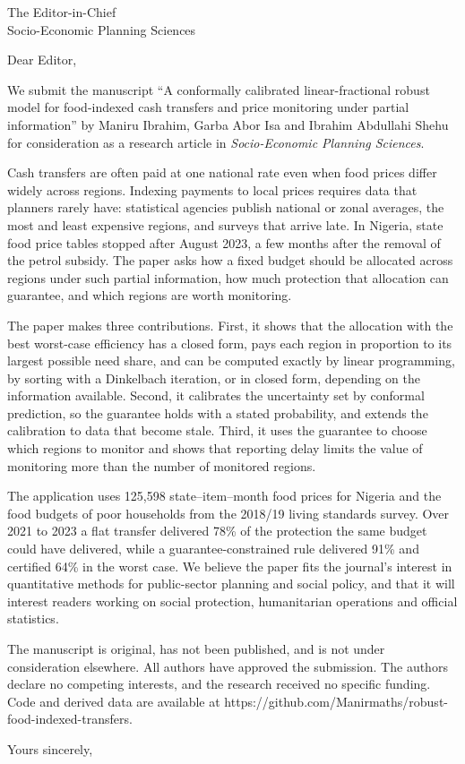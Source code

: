 \documentclass[11pt,a4paper]{letter}
\date{\today}
\begin{document}
\begin{letter}{The Editor-in-Chief\\Socio-Economic Planning Sciences}
\opening{Dear Editor,}

We submit the manuscript ``A conformally calibrated linear-fractional robust model for food-indexed cash transfers and price monitoring under partial information'' by Maniru Ibrahim, Garba Abor Isa and Ibrahim Abdullahi Shehu for consideration as a research article in \emph{Socio-Economic Planning Sciences}.

Cash transfers are often paid at one national rate even when food prices differ widely across regions. Indexing payments to local prices requires data that planners rarely have: statistical agencies publish national or zonal averages, the most and least expensive regions, and surveys that arrive late. In Nigeria, state food price tables stopped after August 2023, a few months after the removal of the petrol subsidy. The paper asks how a fixed budget should be allocated across regions under such partial information, how much protection that allocation can guarantee, and which regions are worth monitoring.

The paper makes three contributions. First, it shows that the allocation with the best worst-case efficiency has a closed form, pays each region in proportion to its largest possible need share, and can be computed exactly by linear programming, by sorting with a Dinkelbach iteration, or in closed form, depending on the information available. Second, it calibrates the uncertainty set by conformal prediction, so the guarantee holds with a stated probability, and extends the calibration to data that become stale. Third, it uses the guarantee to choose which regions to monitor and shows that reporting delay limits the value of monitoring more than the number of monitored regions.

The application uses 125,598 state--item--month food prices for Nigeria and the food budgets of poor households from the 2018/19 living standards survey. Over 2021 to 2023 a flat transfer delivered 78\% of the protection the same budget could have delivered, while a guarantee-constrained rule delivered 91\% and certified 64\% in the worst case. We believe the paper fits the journal's interest in quantitative methods for public-sector planning and social policy, and that it will interest readers working on social protection, humanitarian operations and official statistics.

The manuscript is original, has not been published, and is not under consideration elsewhere. All authors have approved the submission. The authors declare no competing interests, and the research received no specific funding. Code and derived data are available at https://github.com/Manirmaths/robust-food-indexed-transfers.

\closing{Yours sincerely,}
\end{letter}
\end{document}
